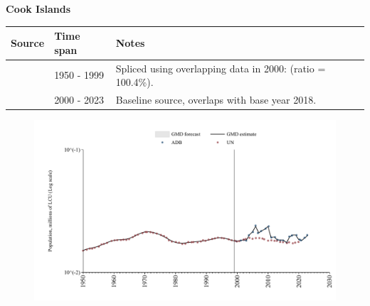 \documentclass[12pt,a4paper,landscape]{article}
\begin{document}
\begin{adjustbox}{max totalsize={\paperwidth}{\paperheight},center}
\begin{minipage}[t][\textheight][t]{\textwidth}
\vspace*{0.5cm}
{}
\begin{center}
{\Large\bfseries Cook Islands}
\end{center}
\vspace{0.5cm}
\begin{table}[H]
\centering
\small
\begin{tabular}{|l|l|l|}
\hline
\textbf{Source} & \textbf{Time span} & \textbf{Notes} \\
\hline
\rowcolor{white}\cite{UN}& 1950 - 1999 &Spliced using overlapping data in 2000: (ratio = 100.4\%).\\
\rowcolor{lightgray}\cite{ADB}& 2000 - 2023 &Baseline source, overlaps with base year 2018.\\
\hline
\end{tabular}
\end{table}
\begin{figure}[H]
\centering
\includegraphics[width=\textwidth,height=0.6\textheight,keepaspectratio]{graphs/COK_pop.pdf}
\end{figure}
\end{minipage}
\end{adjustbox}
\end{document}
